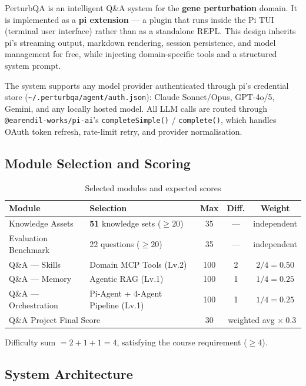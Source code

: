 \documentclass[12pt, a4paper]{article}
\begin{document}
PerturbQA is an intelligent Q\&A system for the \textbf{gene perturbation} domain.
It is implemented as a \textbf{pi extension} --- a plugin that runs inside the Pi TUI
(terminal user interface) rather than as a standalone REPL. This design inherits pi's
streaming output, markdown rendering, session persistence, and model management for free,
while injecting domain-specific tools and a structured system prompt.

The system supports any model provider authenticated through pi's credential store
(\texttt{\textasciitilde/.perturbqa/agent/auth.json}): Claude Sonnet/Opus, GPT-4o/5,
Gemini, and any locally hosted model. All LLM calls are routed through
\texttt{@earendil-works/pi-ai}'s \texttt{completeSimple()} / \texttt{complete()},
which handles OAuth token refresh, rate-limit retry, and provider normalisation.

\subsection{Module Selection and Scoring}

\begin{table}[h]
\centering
\caption{Selected modules and expected scores}
\begin{tabularx}{\textwidth}{lXccc}
\toprule
\textbf{Module} & \textbf{Selection} & \textbf{Max} & \textbf{Diff.} & \textbf{Weight} \\
\midrule
Knowledge Assets     & \textbf{51} knowledge sets ($\ge20$)  & 35  & ---   & independent \\
Evaluation Benchmark & 22 questions ($\ge20$)                & 35  & ---   & independent \\
\midrule
Q\&A --- Skills      & Domain MCP Tools (Lv.2)               & 100 & 2     & $2/4 = 0.50$ \\
Q\&A --- Memory      & Agentic RAG (Lv.1)                    & 100 & 1     & $1/4 = 0.25$ \\
Q\&A --- Orchestration & Pi-Agent + 4-Agent Pipeline (Lv.1) & 100 & 1     & $1/4 = 0.25$ \\
\midrule
\multicolumn{2}{l}{Q\&A Project Final Score} & 30 & \multicolumn{2}{c}{weighted avg $\times\ 0.3$} \\
\bottomrule
\end{tabularx}
\end{table}

Difficulty sum $= 2+1+1 = 4$, satisfying the course requirement ($\ge 4$).

\subsection{System Architecture}
\end{document}
